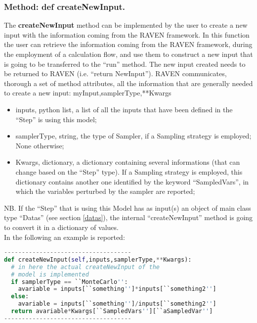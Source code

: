 \subsubsection{Method: def createNewInput.}
\label{subsubsec:externalcreateNewInput}
The \textbf{createNewInput} method can be implemented by the user to create a
new input with the information coming from the RAVEN framework.
%
In this function the user can retrieve the information coming from the RAVEN
framework, during the employment of a calculation flow, and use them to
construct a new input that is going to be transferred to the ``run'' method.
%
The new input created needs to be returned to RAVEN (i.e. ``return NewInput'').
%
RAVEN communicates, thorough a set of method attributes, all the information
that are generally needed to create a new input:
myInput,samplerType,**Kwargs
\begin{itemize}
  \item inputs, python list, a list of all the inputs that have been defined in
  the ``Step'' is using this model;
  \item samplerType, string, the type of Sampler, if a Sampling strategy is
  employed; None otherwise;
  \item Kwargs, dictionary, a dictionary containing several informations (that
  can change based on the ``Step'' type).
  If a Sampling strategy is employed, this dictionary contains another one
  identified by the keyword ``SampledVars'', in which the variables perturbed by
  the sampler are reported;
\end{itemize}
NB.
%
If the ``Step'' that is using this Model has as input(s) an object of main class
type ``Datas'' (see section \ref{datas}), the internal ``createNewInput'' method
is going to convert it in a dictionary of values.
%
\\In the following an example is reported:
\begin{lstlisting}[language=python]
------------------------------------
def createNewInput(self,inputs,samplerType,**Kwargs):
  # in here the actual createNewInput of the
  # model is implemented
  if samplerType == ``MonteCarlo'':
    avariable = inputs[``something'']*inputs[``something2'']
  else:
    avariable = inputs[``something'']/inputs[``something2'']
  return avariable*Kwargs[``SampledVars''][``aSampledVar'']
------------------------------------
\end{lstlisting}
